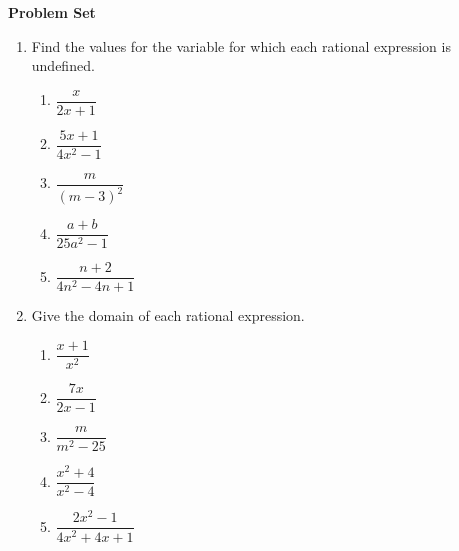 \textbf{Problem Set}

\vspce

\begin{enumerate}[label = \Alph*. ]
\item \hspce Find the values for the variable for which each rational expression is undefined. 
\begin{enumerate}[label = \arabic*. ]
\item \hspce $\dfrac{x}{2x+1}$ 
\item \hspce $\dfrac{5x+1}{4x^2-1}$ 
\item \hspce $\dfrac{m}{(m-3)^2}$ 
\item \hspce $\dfrac{a+b}{25a^2-1}$ 
\item \hspce $\dfrac{n+2}{4n^2-4n+1}$ 
\end{enumerate} 

\item \hspce Give the domain of each rational expression. 
\begin{enumerate}[label = \arabic*. ]
\item \hspce $\dfrac{x+1}{x^2}$ 
\item \hspce $\dfrac{7x}{2x-1}$ 
\item \hspce $\dfrac{m}{m^2-25}$ 
\item \hspce $\dfrac{x^2+4}{x^2-4}$ 
\item \hspce $\dfrac{2x^2-1}{4x^2+4x+1}$ 
\end{enumerate} 

\end{enumerate} 